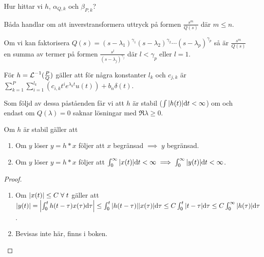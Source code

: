 \documentclass[a4paper]{article}
\begin{document}
Hur hittar vi \(
    h
\), \(
    \alpha_{Q,k}
\) och \(
    \beta_{P,k}
\)? 

Båda handlar om att inverstransformera uttryck på formen \(
    \frac{s^m}{Q(s)} 
\) där \(
    m \leq n
\).

\begin{påst}
    Om vi kan faktorisera \(
        Q(s) = (s-\lambda_1)^{\gamma_1}(s-\lambda_2)^{\gamma_2}\cdots (s-\lambda_p)^{\gamma_p}
    \) så är \(
        \frac{s^m}{Q(s)} 
    \) en summa av termer på formen \(
        \frac{s^l}{(s-\lambda_j)^{\gamma_j}} 
    \) där \(
        l < \gamma_p
    \) eller \(
        l = 1
    \).
\end{påst}

\begin{påst}
    För \(
        h = \operatorname{\mathcal{L}}^{-1}(\frac{P}{Q}) 
    \) gäller att för några konstanter \(
        l_k
    \) och \(
        c_{j,k}
    \) är \(
        \sum_{k=1}^P \sum_{i=1}^{l_k} \left( c_{i,k} t^i e^{\lambda_k t} u(t)\right) + b_n \delta(t)
    \). 
\end{påst}

Som följd av dessa påståenden får vi att \(
    h
\) är stabil (\(
    \int \abs{h(t)} \dd t < \infty
\)) om och endast om \(
    Q(\lambda) = 0 
\) saknar lösningar med \(
    \Re{\lambda} \geq 0
\).

\begin{påst}
    Om \(
        h
    \) är stabil gäller att 
    \begin{enumerate}
        \item Om \(
            y
        \) löser \(
            y = h*x
        \) följer att \(
            x 
        \) begränsad \(
            \implies \; y
        \) begränsad.
        \item Om \(
            y
        \) löser \(
            y = h * x
        \) följer att \(
            \int_0^\infty \abs{x(t)} \dd t < \infty \implies \int_0^\infty \abs{y(t)} \dd t < \infty
        \).
    \end{enumerate}

    \begin{proof}
        ~ \\
        \begin{enumerate}
            \item Om \(
                \abs{x(t)} \leq C \; \forall \; t
            \) gäller att \(
                \abs{y(t)} = \abs{ \int_0^t h(t-\tau) x(\tau) \dd \tau } 
                    \leq \int_0^t \abs{h(t-\tau)} \abs{x(\tau)} \dd \tau
                    \leq C \int_0^t \abs{t-\tau} \dd \tau
                    \leq C \int_0^\infty \abs{h(\tau)} \dd \tau
            \).

            \item Bevisas inte här, finns i boken.
        \end{enumerate}
    \end{proof}
\end{påst}
\end{document}
